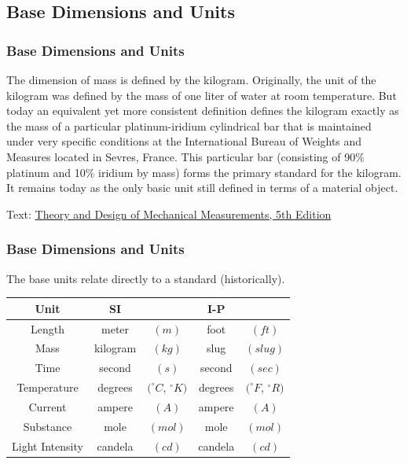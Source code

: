 \documentclass[fleqn]{ltx-talk} %
\newcommand{\sectionIsubsectionIIItitle}{Base Dimensions and Units}
\begin{document}
		\subsection{\sectionIsubsectionIIItitle}\label{sectionIsubsectionIII}
			\begin{frame} 
				\frametitle{\sectionIsubsectionIIItitle}
				\bigskip

				The dimension of mass is defined by the kilogram. Originally, the unit of the kilogram was defined
by the mass of one liter of water at room temperature. But today an equivalent yet more consistent
definition defines the kilogram exactly as the mass of a particular platinum-iridium cylindrical bar
that is maintained under very specific conditions at the International Bureau of Weights and
Measures located in Sevres, France. This particular bar (consisting of 90\% platinum and 10\%
iridium by mass) forms the primary standard for the kilogram. It remains today as the only basic unit
still defined in terms of a material object.

{\tiny Text: \underline{Theory and Design of Mechanical Measurements, 5th Edition}}


			\end{frame}	

			\begin{frame}[containsverbatim] 
				\frametitle{\sectionIsubsectionIIItitle}

				The {\BL base units} relate directly to a standard (historically).\vspc

\renewcommand{\arraystretch}{1.2}
\begin{tabular}{|c|cc|cc|} \hline
\textbf{Unit}&\textbf{SI}&&\textbf{I-P}&\\ \hline\hline
Length&meter&$(m)$&foot&$(ft)$\\ \hline
Mass&kilogram&$(kg)$&slug&$(slug)$ \\\hline
Time&second&$(s)$&second&$(sec)$\\ \hline
Temperature&degrees&$(^\circ C$, $^\circ K)$&degrees&$(^\circ F$, $^\circ R)$ \\ \hline
Current&ampere&$(A)$&ampere&$(A)$\\ \hline
Substance&mole&$(mol)$&mole&$(mol)$\\ \hline
Light Intensity&candela&$(cd)$&candela&$(cd)$\\ \hline
\end{tabular}

				
			\end{frame}	
\end{document}
